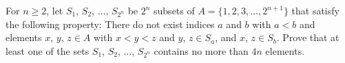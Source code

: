 For $ n\ge 2$,  let $ S_1$,  $ S_2$,  $ \ldots$,  $ S_{2^n}$ be $ 2^n$ subsets of $ A = \{1, 2, 3, \ldots, 2^{n + 1}\}$ that satisfy the following property: There do not exist indices $ a$ and $ b$ with $ a < b$ and elements $ x$,  $ y$,  $ z\in A$ with $ x < y < z$ and $ y$,  $ z\in S_a$,  and $ x$,  $ z\in S_b$. Prove that at least one of the sets $ S_1$,  $ S_2$,  $ \ldots$,  $ S_{2^n}$ contains no more than $ 4n$ elements.